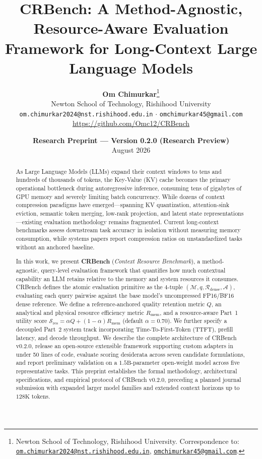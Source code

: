 \documentclass[11pt,a4paper]{article}
\title{\textbf{CRBench: A Method-Agnostic, Resource-Aware Evaluation Framework for Long-Context Large Language Models}}
\author{
  \textbf{Om Chimurkar}\thanks{Newton School of Technology, Rishihood University. Correspondence to: \href{mailto:om.chimurkar2024@nst.rishihood.edu.in}{\nolinkurl{om.chimurkar2024@nst.rishihood.edu.in}}, \href{mailto:omchimurkar45@gmail.com}{\nolinkurl{omchimurkar45@gmail.com}}.} \\[0.25em]
  \small Newton School of Technology, Rishihood University \\[0.1em]
  \small \texttt{om.chimurkar2024@nst.rishihood.edu.in} \quad $\cdot$ \quad \texttt{omchimurkar45@gmail.com} \\[0.25em]
  \small \url{https://github.com/Omc12/CRBench}
}
\date{\textbf{Research Preprint --- Version 0.2.0 (Research Preview)} \\ August 2026}
\begin{document}
\maketitle

\begin{abstract}
As Large Language Models (LLMs) expand their context windows to tens and hundreds of thousands of tokens, the Key-Value (KV) cache becomes the primary operational bottleneck during autoregressive inference, consuming tens of gigabytes of GPU memory and severely limiting batch concurrency. While dozens of context compression paradigms have emerged---spanning KV quantization, attention-sink eviction, semantic token merging, low-rank projection, and latent state representations---existing evaluation methodology remains fragmented. Current long-context benchmarks assess downstream task accuracy in isolation without measuring memory consumption, while systems papers report compression ratios on unstandardized tasks without an anchored baseline. 

In this work, we present \textbf{CRBench} (\textit{Context Resource Benchmark}), a method-agnostic, query-level evaluation framework that quantifies how much contextual capability an LLM retains relative to the memory and system resources it consumes. CRBench defines the atomic evaluation primitive as the 4-tuple $(\mathcal{M}, q, \mathcal{R}_{\text{dense}}, \mathcal{A})$, evaluating each query pairwise against the base model's uncompressed FP16/BF16 dense reference. We define a reference-anchored quality retention metric $Q$, an analytical and physical resource efficiency metric $R_{\text{mem}}$, and a resource-aware Part~1 utility score $\mathcal{S}_{\text{res}} = \alpha Q + (1 - \alpha) R_{\text{mem}}$ (default $\alpha = 0.70$). We further specify a decoupled Part~2 system track incorporating Time-To-First-Token (TTFT), prefill latency, and decode throughput. We describe the complete architecture of CRBench v0.2.0, release an open-source extensible framework supporting custom adapters in under 50 lines of code, evaluate scoring desiderata across seven candidate formulations, and report preliminary validation on a $1.5\text{B}$-parameter open-weight model across five representative tasks. This preprint establishes the formal methodology, architectural specifications, and empirical protocol of CRBench v0.2.0, preceding a planned journal submission with expanded larger model families and extended context horizons up to $128\text{K}$ tokens.
\end{abstract}
\end{document}
